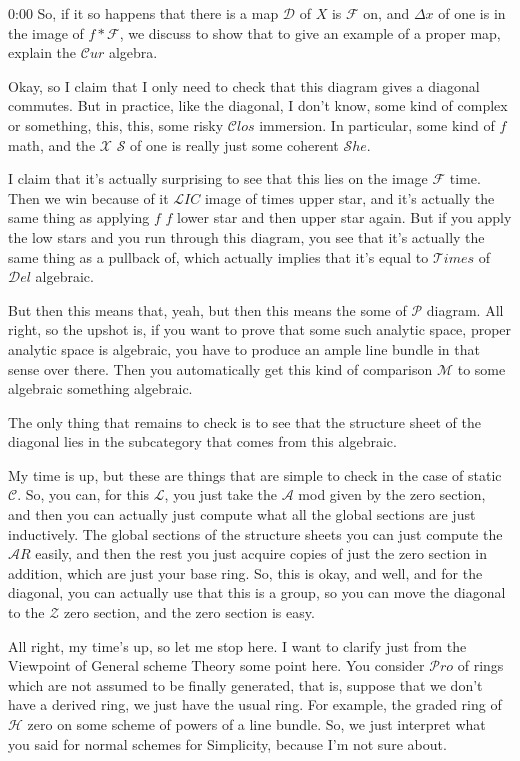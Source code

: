 \begin{unfinished}{0:00}
So, if it so happens that there is a map $\mathcal{D}$ of $X$ is $\mathcal{F}$ on, and $\Delta x$ of one is in the image of $f * \mathcal{F}$, we discuss to show that to give an example of a proper map, explain the $\mathcal{C}ur$ algebra.

Okay, so I claim that I only need to check that this diagram gives a diagonal commutes. But in practice, like the diagonal, I don't know, some kind of complex or something, this, this, some risky $\mathcal{C}los$ immersion. In particular, some kind of $f$ math, and the $\mathcal{X}$ $\mathcal{S}$ of one is really just some coherent $\mathcal{S}he$.

I claim that it's actually surprising to see that this lies on the image $\mathcal{F}$ time. Then we win because of it $\mathcal{L}IC$ image of times upper star, and it's actually the same thing as applying $f$ $f$ lower star and then upper star again. But if you apply the low stars and you run through this diagram, you see that it's actually the same thing as a pullback of, which actually implies that it's equal to $\mathcal{T}imes$ of $\mathcal{D}el$ algebraic.

But then this means that, yeah, but then this means the some of $\mathcal{P}$ diagram. All right, so the upshot is, if you want to prove that some such analytic space, proper analytic space is algebraic, you have to produce an ample line bundle in that sense over there. Then you automatically get this kind of comparison $\mathcal{M}$ to some algebraic something algebraic.

The only thing that remains to check is to see that the structure sheet of the diagonal lies in the subcategory that comes from this algebraic.

My time is up, but these are things that are simple to check in the case of static $\mathcal{C}$. So, you can, for this $\mathcal{L}$, you just take the $\mathcal{A}$ mod given by the zero section, and then you can actually just compute what all the global sections are just inductively. The global sections of the structure sheets you can just compute the $\mathcal{A}R$ easily, and then the rest you just acquire copies of just the zero section in addition, which are just your base ring. So, this is okay, and well, and for the diagonal, you can actually use that this is a group, so you can move the diagonal to the $\mathcal{Z}$ zero section, and the zero section is easy.

All right, my time's up, so let me stop here. I want to clarify just from the Viewpoint of General scheme Theory some point here. You consider $\mathcal{P}ro$ of rings which are not assumed to be finally generated, that is, suppose that we don't have a derived ring, we just have the usual ring. For example, the graded ring of $\mathcal{H}$ zero on some scheme of powers of a line bundle. So, we just interpret what you said for normal schemes for Simplicity, because I'm not sure about.


\end{unfinished}

